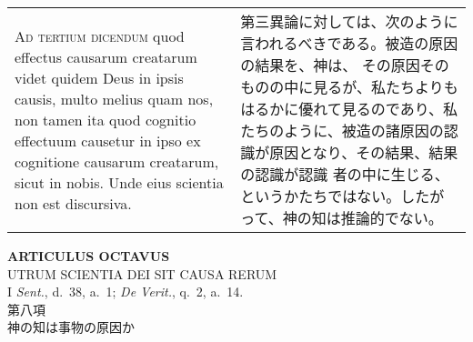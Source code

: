 \documentclass[10pt]{jsarticle} %
\begin{document}
\begin{longtable}{p{21em}p{21em}}
\\


{\scshape Ad tertium dicendum} quod effectus causarum
creatarum videt quidem Deus in ipsis causis, multo melius quam nos, non
tamen ita quod cognitio effectuum causetur in ipso ex cognitione
causarum creatarum, sicut in nobis. Unde eius scientia non est
discursiva.

&

第三異論に対しては、次のように言われるべきである。被造の原因の結果を、神は、
その原因そのものの中に見るが、私たちよりもはるかに優れて見るのであり、私
たちのように、被造の諸原因の認識が原因となり、その結果、結果の認識が認識
者の中に生じる、というかたちではない。したがって、神の知は推論的でない。


\end{longtable}
\newpage




\begin{center}
 {\Large {\bf ARTICULUS OCTAVUS}}\\
 {\large UTRUM SCIENTIA DEI SIT CAUSA RERUM}\\
 {\footnotesize I {\itshape Sent.}, d.~38, a.~1; {\itshape De Verit.}, q.~2, a.~14.}\\
 {\Large 第八項\\神の知は事物の原因か}
\end{center}
\end{document}
